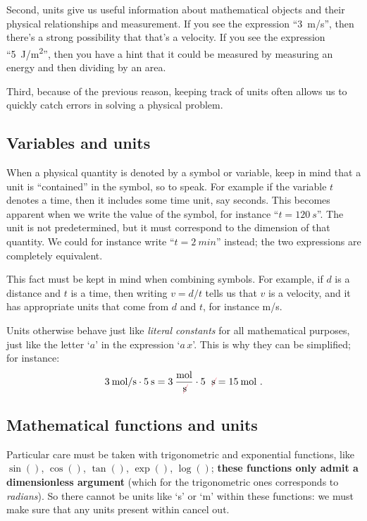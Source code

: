 \documentclass[a4paper,12pt,%
onecolumn,oneside,titlepage,%
british%
]{memoir}
\renewcommand*{\|}[1][]{\nonscript\:#1\vert\nonscript\:\mathopen{}}
\begin{document}
Second, units give us useful information about mathematical objects and their physical relationships and measurement. If you see the expression \enquote{\qty{3}{m/s}}, then there's a strong possibility that that's a velocity. If you see the expression \enquote{\qty{5}{J/m^2}}, then you have a hint that it could be measured by measuring an energy and then dividing by an area.

Third, because of the previous reason, keeping track of units often allows us to quickly catch errors in solving a physical problem.

\subsection{Variables and units}
\label{sec:variables_units}

When a physical quantity is denoted by a symbol or variable, keep in mind that a unit is \enquote{contained} in the symbol, so to speak. For example if the variable $t$ denotes a time, then it includes some time unit, say seconds. This becomes apparent when we write the value of the symbol, for instance \enquote{$t=\qty{120}{s}$}. The unit is not predetermined, but it must correspond to the dimension of that quantity. We could for instance write \enquote{$t=\qty{2}{min}$} instead; the two expressions are completely equivalent.

This fact must be kept in mind when combining symbols. For example, if $d$ is a distance and $t$ is a time, then writing $v=d/t$ tells us that $v$ is a velocity, and it has appropriate units that come from $d$ and $t$, for instance \unit{m/s}.

Units otherwise behave just like \emph{literal constants} for all mathematical purposes, just like the letter \enquote*{$a$} in the expression \enquote*{$a\, x$}. This is why they can be simplified; for instance:
\begin{equation*}
  \qty{3}{mol/s} \cdot \qty{5}{s} =
  \num{3}\:\frac{\unit{mol}}{\mathcolor{red}{\not}\!\unit{s}} \cdot \num{5}\:\mathcolor{red}{\not}\!\unit{s} = \qty{15}{mol} \ .
\end{equation*}

\subsection{Mathematical functions and units}
\label{sec:functions_units}

Particular care must be taken with trigonometric and exponential functions, like $\sin()$, $\cos()$, $\tan()$, $\exp()$, $\log()$; \textbf{these functions only admit a dimensionless argument} (which for the trigonometric ones corresponds to \emph{radians}). So there cannot be units like \enquote*{\unit{s}} or \enquote*{\unit{m}} within these functions: we must make sure that any units present within cancel out.
\end{document}
